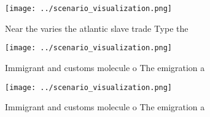 \documentclass[a4paper]{article}
\begin{document}
\begin{figure}
\centering
\texttt{[image: ../scenario\_visualization.png]}
\caption{Near the varies the atlantic slave trade Type the
}
\end{figure}
 
\begin{figure}
\centering
\texttt{[image: ../scenario\_visualization.png]}
\caption{Immigrant and customs molecule o The emigration a
}
\end{figure}
 
\begin{figure}
\centering
\texttt{[image: ../scenario\_visualization.png]}
\caption{Immigrant and customs molecule o The emigration a
}
\end{figure}
 
\end{document}

